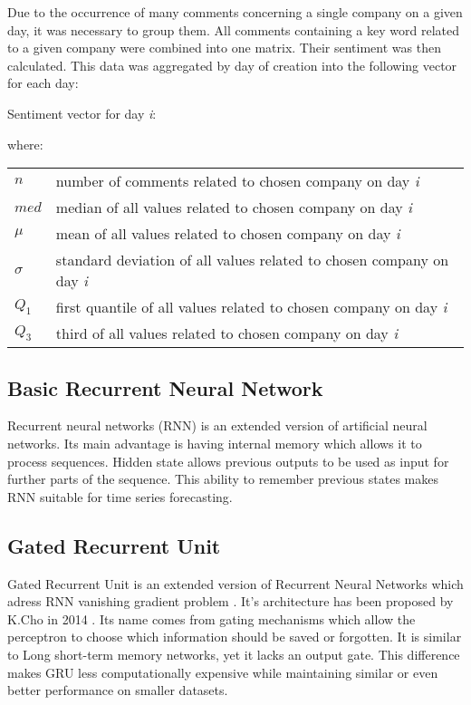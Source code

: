 \documentclass[11pt]{article} %
\makeatletter
\newenvironment{conditions}
  {\par\vspace{\abovedisplayskip}\noindent\begin{tabular}{>{$}l<{$} @{${}={}$} l}}
  {\end{tabular}\par\vspace{\belowdisplayskip}}
\makeatother
\begin{document}
Due to the occurrence of many comments concerning a single company on a given day, it was necessary to group them. All comments containing a key word related to a given company were combined into one matrix. Their sentiment was then calculated. This data was aggregated by day of creation into the following vector for each day: 
\begin{center}   Sentiment vector for day \emph{i}:\end{center}
\begin{equation} [n, \mu, \sigma, med, Q_1, Q_3] \end{equation}
where:
\begin{conditions}
 n     &  number of comments related to chosen company on day \emph{i}\\
 med     &  median of all values related to chosen company on day \emph{i} \\  
\mu    &  mean of all values related to chosen company on day \emph{i} \\    
\sigma    &  standard deviation of all values related to chosen company on day \emph{i} \\   
Q_1     &  first quantile of all values related to chosen company on day \emph{i} \\   
Q_3     &  third of all values related to chosen company on day \emph{i} \\   
\end{conditions}

\subsection{Basic Recurrent Neural Network}

Recurrent neural networks (RNN) is an extended version of artificial neural networks. Its main advantage is having internal memory which allows it to process sequences. Hidden state allows previous outputs to be used as input for further parts of the sequence. This ability to remember previous states makes RNN suitable for time series forecasting. 

\subsection{Gated Recurrent Unit}

Gated Recurrent Unit is an extended version of Recurrent Neural Networks which adress RNN vanishing gradient problem \cite{gru2}.
It's architecture has been proposed by K.Cho in 2014 \cite{gru3}. Its name comes from gating mechanisms which allow the perceptron to choose which information should be saved or forgotten. It is similar to  Long short-term memory networks, yet it lacks an output gate. This difference makes GRU less computationally expensive while maintaining similar or even better performance on smaller datasets. 
\end{document}
